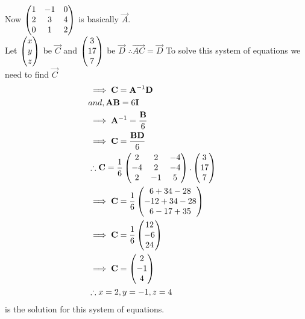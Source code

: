\documentclass[journal,12pt,twocolumn]{IEEEtran}
\begin{document}
        Now $\begin{pmatrix}1 & -1 & 0\\2 & 3 & 4\\0 & 1 & 2\end{pmatrix}$ is basically $\vec{A}$.\\
        Let $\begin{pmatrix}x\\y\\z\end{pmatrix}$ be $\vec{C}$ and $\begin{pmatrix}3\\17\\7\end{pmatrix}$ be $\vec{D}$
        $ \therefore \vec{AC}=\vec{D}$
        To solve this system of equations we need to find $\vec{C}$\\
        \begin{align}
        &\implies \mathbf{C} = \mathbf{A}^{-1}\mathbf{D} &&\\
        &and, \mathbf{AB}=6\mathbf{I} &&\\
        &\implies \mathbf{A}^{-1} = \dfrac{\mathbf{B}}{6} &&\\
        &\implies \mathbf{C} = \dfrac{\mathbf{BD}}{6 }&&\\
        &\therefore \mathbf{C} = \dfrac{1}{6}\begin{pmatrix}2 & 2 & -4\\-4 & 2 &-4\\2 & -1 & 5\end{pmatrix}.\begin{pmatrix}3\\17\\7\end{pmatrix} &&\\
        &\implies \mathbf{C} = \dfrac{1}{6}\begin{pmatrix}6+34-28\\-12+34-28\\6-17+35 \end{pmatrix}&&\\
        &\implies \mathbf{C} = \dfrac{1}{6}\begin{pmatrix}12\\-6\\24\end{pmatrix} &&\\
        &\implies \mathbf{C} = \begin{pmatrix}2\\-1\\4\end{pmatrix} &&\\
        &\therefore x=2,y=-1,z=4&&
        \end{align} is the solution for this system of equations.\\
\end{document}
